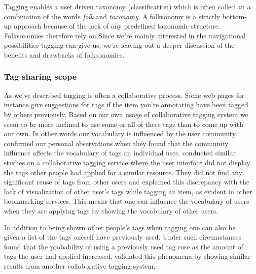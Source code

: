 Tagging enables a user driven taxonomy (classification)
which is often called an \dash{}a combination of the words
\emph{folk} and \emph{taxonomy}. A folksonomy is a strictly bottom-up
approach because of the lack of any predefined taxonomic structure.
Folksonomies therefore rely on 
Since we're mainly interested in the navigational possibilities tagging can
give us, we're leaving out a deeper discussion of the benefits and drawbacks
of folksonomies.%

\subsubsection{Tag sharing \oldand scope}
\label{section:social.navigation.applied.forms.tagging.sharing}

As we've described tagging is often a collaborative process. Some web pages
for instance give suggestions for tags if the item you're annotating have
been tagged by others previously. Based on our own usage of collaborative
tagging system we seem to be more inclined to use some or all of these tags
than to come up with our own. In other words our vocabulary is influenced
by the user community. \citet[]{sen06} confirmed our personal
observations when they found that the community influence affects the
vocabulary of tags an individual uses. \citet[]{farooq07} conducted
similar studies on a collaborative tagging service where the user interface
did not display the tags other people had applied for a similar resource.
They did not find any significant reuse of tags from other users and explained
this discrepancy with the lack of visualization of other user's tags while
tagging an item, as
evident in other bookmarking services. This means that one can influence
the vocabulary of users when they are applying tags by showing the
vocabulary of other users.

In addition to being shown other people's tags when tagging one can also
be given a list of the tags oneself have previously used.
Under such circumstances \citet[]{sen06} found that the probability
of using a previously used tag rose as the amount of tags the user had
applied increased. \citet[]{farooq07} validated this phenomena
by showing similar results from another collaborative tagging system.

